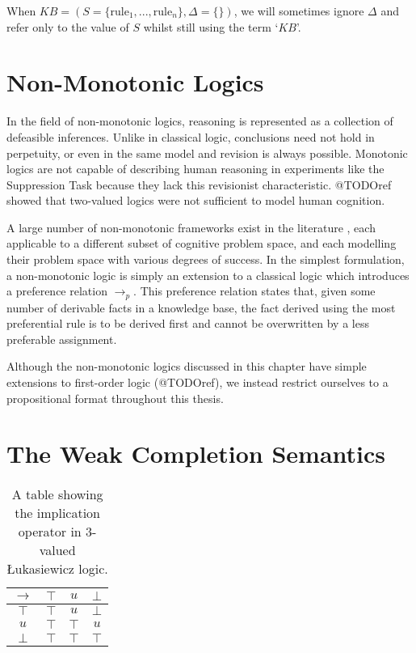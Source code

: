 When $KB=(S=\{\textrm{rule}_1,...,\textrm{rule}_n\},\Delta=\{\})$, we will sometimes ignore $\Delta$ and refer only to the value of $S$ whilst still using the term `$KB$'.
%




\section{Non-Monotonic Logics}
In the field of non-monotonic logics, reasoning is represented as a collection of defeasible inferences. Unlike in classical logic, conclusions need not hold in perpetuity, or even in the same model and revision is always possible. Monotonic logics are not capable of describing human reasoning in experiments like the Suppression Task \citep{dietz2012computational} because they lack this revisionist characteristic. @TODOref showed that two-valued logics were not sufficient to model human cognition.

A large number of non-monotonic frameworks exist in the literature \citep{mcdermott1980non}, each applicable to a different subset of cognitive problem space, and each modelling their problem space with various degrees of success. In the simplest formulation, a non-monotonic logic is simply an extension to a classical logic which introduces a preference relation $\rightarrow_p$. This preference relation states that, given some number of derivable facts in a knowledge base, the fact derived using the most preferential rule is to be derived first and cannot be overwritten by a less preferable assignment.  

Although the non-monotonic logics discussed in this chapter have simple extensions to first-order logic (@TODOref), we instead restrict ourselves to a propositional format throughout this thesis.
\section{The Weak Completion Semantics}
\begin{table}
\begin{center}
\begin{tabular}{ c | c c c }
  $\rightarrow$& $\top$ & $u$ & $\bot$ \\ \hline
 $\top$ & $\top$ & $u$ & $\bot$ \\  
 $u$ & $\top$ & $\top$ & $u$\\  
 $\bot$ & $\top$ & $\top$ & $\top$
\end{tabular}
\caption{A table showing the implication operator in 3-valued \L ukasiewicz logic.}
\label{tbl:luk}
\end{center}
\end{table}

